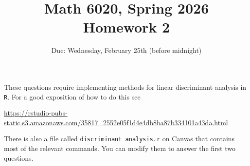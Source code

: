 \documentclass[11pt]{article}
\theoremstyle{definition}
\newcommand{\1}[1]{\mathbf{1} \left \{ #1 \right \}}
\begin{document}
\title{Math 6020, Spring 2026 \\ Homework 2 }
\date{Due: Wednesday, February 25th (before midnight)}


\maketitle

These questions require implementing methods for linear discriminant analysis in \texttt{R}. For a good exposition of how to do this see
\begin{center}
	\url{https://rstudio-pubs-static.s3.amazonaws.com/35817_2552e05f1d4e4db8ba87b334101a43da.html}
\end{center}
There is also a file called \texttt{discriminant analysis.r} on Canvas that contains most of the relevant commands. You can modify them to answer the first two questions.
\end{document}
